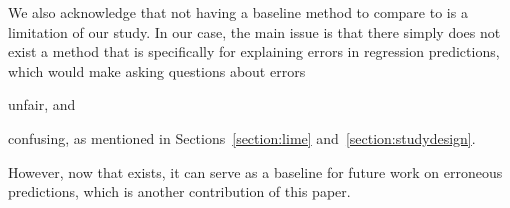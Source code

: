 We also acknowledge that not having a baseline method to compare to is a limitation of our study. 
In our case, the main issue is that there simply does not exist a method that is specifically for explaining errors in regression predictions, which would make asking questions about errors 
\begin{inparaenum}[(i)]
	\item unfair, and 
	\item confusing, as mentioned in Sections~\ref{section:lime} and~\ref{section:studydesign}. 
\end{inparaenum}
However, now that \OurMethod{}  exists, it can serve as a baseline for future work on erroneous predictions, which is another contribution of this paper. 


